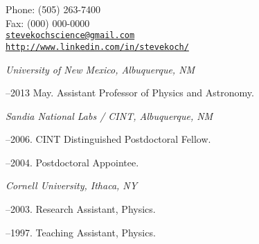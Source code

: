 \documentclass[11pt]{article}
\makeatletter
\def\myemail{stevekochscience@gmail.com}
\def\myweb{http://www.linkedin.com/in/stevekoch/}
\def\myphone{(505) 263-7400}
\def\myfax{(000) 000-0000}
\makeatother
\begin{document}
\begin{minipage}[t]{2.95in}
  
\end{minipage}
\hfill     
\hfill
\begin{minipage}[t]{1.7in}
  \flushright \footnotesize Phone: \myphone \\ 
  Fax: \myfax  \\ 
  {\scriptsize  \texttt{\href{mailto:\myemail}{\myemail}}} \\
  {\scriptsize  \texttt{\href{\myweb}{\myweb}}}
\end{minipage}


\medskip

\reversemarginpar

\medskip       

\medskip
{}

\noindent\emph{University of New Mexico, Albuquerque, NM \vspace{0.01in}}

--2013 May. Assistant Professor of Physics and Astronomy.      

\medskip
\noindent\emph{Sandia National Labs / CINT, Albuquerque, NM \vspace{0.01in}}

--2006. CINT Distinguished Postdoctoral Fellow.

--2004. Postdoctoral Appointee.

\medskip

\noindent\emph{Cornell University, Ithaca, NY \vspace{0.01in}}

--2003. Research Assistant, Physics.

--1997. Teaching Assistant, Physics.
\end{document}
